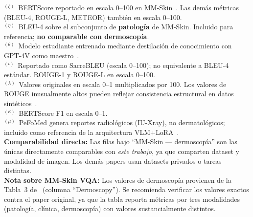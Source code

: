 \begin{table}[htbp]
{\begin{tabular}{@{}lllrrrrrl@{}}
\bottomrule
\end{tabular}%
}
\vspace{4pt}
\begin{minipage}{\textwidth}
  \footnotesize
  $^{(\zeta)}$~BERTScore reportado en escala 0--100 en MM-Skin~\cite{MMSkin2025}.
  Las demás métricas (BLEU-4, ROUGE-L, METEOR) también en escala 0--100.\\
  $^{(\eta)}$~BLEU-4 sobre el subconjunto de \textbf{patología} de MM-Skin.
  Incluido para referencia; \textbf{no comparable con dermoscopía}.\\
  $^{(\theta)}$~Modelo estudiante entrenado mediante destilación de conocimiento
  con GPT-4V como maestro~\cite{AutomatedReport2025}.\\
  $^{(\iota)}$~Reportado como SacreBLEU (escala 0--100); no equivalente a
  BLEU-4 estándar. ROUGE-1 y ROUGE-L en escala 0--100.\\
  $^{(\lambda)}$~Valores originales en escala 0--1 multiplicados por 100.
  Los valores de ROUGE inusualmente altos pueden reflejar consistencia
  estructural en datos sintéticos~\cite{DermatoLlama2025}.\\
  $^{(\kappa)}$~BERTScore F1 en escala 0--1.\\
  $^{(\mu)}$~PeFoMed genera reportes radiológicos (IU-Xray), no dermatológicos;
  incluido como referencia de la arquitectura VLM$+$LoRA~\cite{PeFoMed2024}.\\[4pt]
  \textbf{Comparabilidad directa:} Las filas bajo ``MM-Skin — dermoscopía''
  son las únicas directamente comparables con \textit{este trabajo},
  ya que comparten dataset y modalidad de imagen.
  Los demás papers usan datasets privados o tareas distintas.\\[4pt]
  \textbf{Nota sobre MM-Skin VQA:} Los valores de dermoscopía provienen
  de la Tabla~3 de~\cite{MMSkin2025} (columna ``Dermoscopy'').
  Se recomienda verificar los valores exactos contra el paper original,
  ya que la tabla reporta métricas por tres modalidades
  (patología, clínica, dermoscopía) con valores sustancialmente distintos.
\end{minipage}
\end{table}


